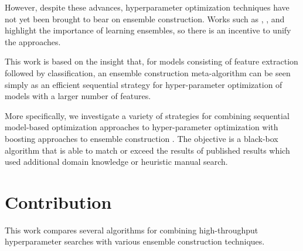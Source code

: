 \documentclass[11pt,twocolumn]{article}
\begin{document}
\vspace{11pt}
However, despite these advances, hyperparameter optimization techniques have not
yet been brought to bear on ensemble construction.  Works such as
\cite{gehler+nowozin:2009}, \cite{coates+lee+ng:2011},
and \cite{pinto+cox:2011} highlight the importance of learning ensembles, so there is an incentive
to unify the approaches.

\vspace{11pt}
This work is based on the insight that, for models consisting of feature extraction followed by classification,
an ensemble construction meta-algorithm can be seen simply as an
efficient sequential strategy for hyper-parameter optimization of
models with a larger number of features.

\vspace{11pt}
More specifically, we investigate a variety of strategies for combining sequential model-based
optimization approaches to hyper-parameter optimization with boosting
approaches to ensemble construction \cite{mason+baxter+bartlett+fraen:1999,
friedman:1999}.
The objective is a black-box algorithm that is able to match or exceed the
results of published results which used additional domain knowledge or
heuristic manual search.

\iffalse
\begin{figure}
    \texttt{[image: convergence\_100\_10.pdf]}

    \texttt{[image: figures/dbn\_efficiency/dbn\_efficiency\_mnist\_basic]}
    \caption{

    }
\end{figure}
\fi


\section{Contribution}

This work compares several algorithms for combining high-throughput hyperparameter searches with various ensemble construction techniques.
\end{document}
